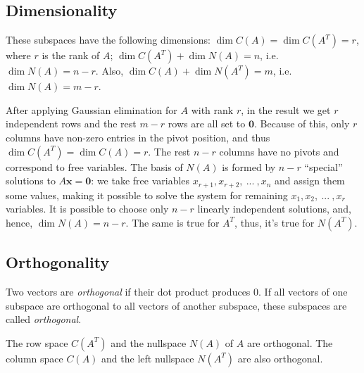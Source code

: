 \documentclass{acm_proc_article-sp}
\begin{document}
\subsection{Dimensionality}

These subspaces have the following dimensions: \(\operatorname{dim} C(A) = \operatorname{dim} C(A^T) = r\), where \(r\) is the rank of \(A\); \(\operatorname{dim} C(A^T) + \operatorname{dim} N(A) = n\), i.e. \(\operatorname{dim} N(A) = n - r\).
Also, \(\operatorname{dim} C(A) + \operatorname{dim} N(A^T) = m\), i.e. \(\operatorname{dim} N(A) = m - r\).


After applying Gaussian elimination for $A$ with rank $r$, in the result we get $r$ independent rows and the rest $m - r$ rows are all set to $\mathbf 0$.
Because of this, only $r$ columns have non-zero entries in the pivot position, and thus $\operatorname{dim} C(A^T) = \operatorname{dim} C(A) = r$. The rest $n-r$ columns have no pivots and correspond to free variables. The basis of \(N(A)\) is formed by \(n - r\) ``special'' solutions to \(A \mathbf x = \mathbf 0\):
we take free variables $x_{r+1}, x_{r+2}, \ ... \ , x_n$ and assign them some values, making it possible to solve the system for remaining $x_{1}, x_{2}, \ ... \ , x_r$ variables. It is possible to choose only $n-r$ linearly independent solutions, and, hence, \(\operatorname{dim} N(A) = n - r\). The same is true for $A^T$, thus, it's true for $N(A^T)$.


\subsection{Orthogonality}

Two vectors are \emph{orthogonal} if their dot product produces 0. If all vectors of one subspace are orthogonal to all vectors of another subspace, these subspaces are called \emph{orthogonal}.

\begin{prop}
The row space \(C(A^T)\) and the nullspace \(N(A)\) of \(A\) are
orthogonal. The column space \(C(A)\) and the left
nullspace \(N(A^T)\) are also orthogonal.
\end{prop}
\end{document}
